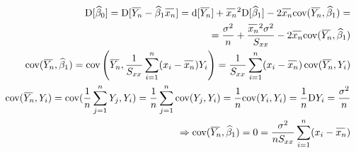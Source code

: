 \begin{proofname}
\begin{enumerate}
\begin{equation*}
  \begin{aligned}
  			\D [ \widehat{\beta}_{0} ] = \D [ \oyn - \widehat{\beta}_{1} \oxnn ] = \d [ \oyn ] + \oxnn ^{2} \D [ \widehat{\beta}_{1} ] - 2 \oxnn \text{cov}(\oyn , \widehat{\beta}_{1} ) = \\
  	= \frac{\sigma^{2}}{n} + \frac{\oxnn ^{2} \sigma^{2} }{S_{xx}} - 2 \oxnn \text{cov}( \oyn ,  \widehat{\beta}_{1} ) \\
\text{cov}( \oyn ,  \widehat{\beta}_{1} ) = \text{cov} \left( \oyn , \frac{1}{S_{xx}} \sumin ( x_i - \oxnn ) Y_i \right) = \frac{1}{S_{xx}} \sumin ( x_i - \oxnn ) \, \text{cov} ( \oyn , Y_i )  \\
\text{cov} ( \oyn , Y_i ) = \text{cov} ( \frac{1}{n} \sumjn Y_j , Y_i ) =  \frac{1}{n} \sumjn \text{cov} ( Y_j , Y_i ) = \frac{1}{n} \text{cov} ( Y_i , Y_i ) =  	\frac{1}{n} \D Y_i =  \frac{\sigma^{2}}{n}	\\
\Rightarrow  \text{cov}( \oyn ,  \widehat{\beta}_{1} ) = 0 = \frac{\sigma^{2}}{n S_{xx}} \sumin ( x_i - \oxnn )	
  			\end{aligned}
  		\end{equation*}
\end{enumerate}
\end{proofname}



